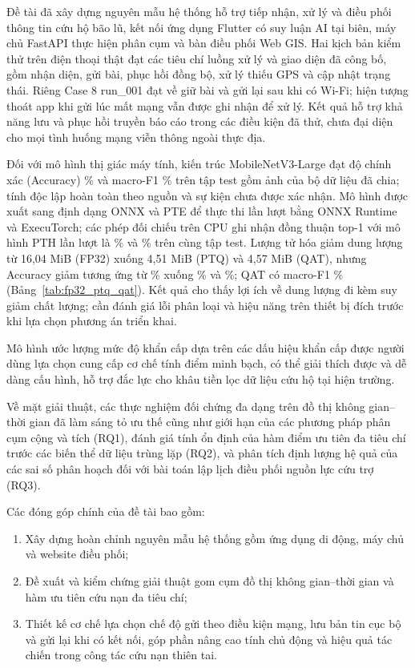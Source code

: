\label{chap:conclusion}
Đề tài đã xây dựng nguyên mẫu hệ thống hỗ trợ tiếp nhận, xử lý và điều phối thông tin cứu hộ bão lũ, kết nối ứng dụng Flutter có suy luận AI tại biên, máy chủ FastAPI thực hiện phân cụm và bàn điều phối Web GIS. Hai kịch bản kiểm thử trên điện thoại thật đạt các tiêu chí luồng xử lý và giao diện đã công bố, gồm nhận diện, gửi bài, phục hồi đồng bộ, xử lý thiếu GPS và cập nhật trạng thái. Riêng Case 8 run\_001 đạt về giữ bài và gửi lại sau khi có Wi-Fi; hiện tượng thoát app khi gửi lúc mất mạng vẫn được ghi nhận để xử lý. Kết quả hỗ trợ khả năng lưu và phục hồi truyền báo cáo trong các điều kiện đã thử, chưa đại diện cho mọi tình huống mạng viễn thông ngoài thực địa.

Đối với mô hình thị giác máy tính, kiến trúc MobileNetV3-Large đạt độ chính xác (Accuracy) \NewImageAccuracy\% và macro-F1 \NewImageMacroFOne\% trên tập test gồm \ImageTest{} ảnh của bộ dữ liệu đã chia; tính độc lập hoàn toàn theo nguồn và sự kiện chưa được xác nhận. Mô hình được xuất sang định dạng ONNX và PTE để thực thi lần lượt bằng ONNX Runtime và ExecuTorch; các phép đối chiếu trên CPU ghi nhận đồng thuận top-1 với mô hình PTH lần lượt là \CpuOnnxAgreement\% và \CpuPteAgreement\% trên cùng tập test. Lượng tử hóa giảm dung lượng từ 16,04 MiB (FP32) xuống 4,51 MiB (PTQ) và 4,57 MiB (QAT), nhưng Accuracy giảm tương ứng từ \NewImageAccuracy\% xuống \PTQAccuracy\% và \QATAccuracy\%; QAT có macro-F1 \QATMacroFOne\% (Bảng~\ref{tab:fp32_ptq_qat}). Kết quả cho thấy lợi ích về dung lượng đi kèm suy giảm chất lượng; cần đánh giá lỗi phân loại và hiệu năng trên thiết bị đích trước khi lựa chọn phương án triển khai.

Mô hình ước lượng mức độ khẩn cấp dựa trên các dấu hiệu khẩn cấp được người dùng lựa chọn cung cấp cơ chế tính điểm minh bạch, có thể giải thích được và dễ dàng cấu hình, hỗ trợ đắc lực cho khâu tiền lọc dữ liệu cứu hộ tại hiện trường.

Về mặt giải thuật, các thực nghiệm đối chứng đa dạng trên đồ thị không gian--thời gian đã làm sáng tỏ ưu thế cũng như giới hạn của các phương pháp phân cụm cộng và tích (RQ1), đánh giá tính ổn định của hàm điểm ưu tiên đa tiêu chí trước các biến thể dữ liệu trùng lặp (RQ2), và phân tích định lượng hệ quả của các sai số phân hoạch đối với bài toán lập lịch điều phối nguồn lực cứu trợ (RQ3).

Các đóng góp chính của đề tài bao gồm:
\begin{enumerate}
\item Xây dựng hoàn chỉnh nguyên mẫu hệ thống gồm ứng dụng di động, máy chủ và website điều phối;
\item Đề xuất và kiểm chứng giải thuật gom cụm đồ thị không gian--thời gian và hàm ưu tiên cứu nạn đa tiêu chí;
\item Thiết kế cơ chế lựa chọn chế độ gửi theo điều kiện mạng, lưu bản tin cục bộ và gửi lại khi có kết nối, góp phần nâng cao tính chủ động và hiệu quả tác chiến trong công tác cứu nạn thiên tai.
\end{enumerate}

